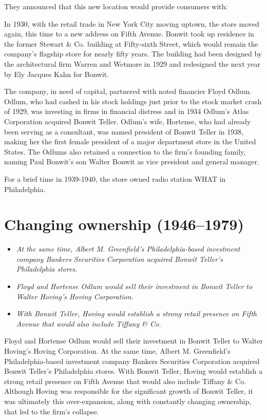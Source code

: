 They announced that this new location would provide consumers with:

In 1930, with the retail trade in New York City moving uptown, the store
moved again, this time to a new address on Fifth Avenue. Bonwit took up
residence in the former Stewart \& Co. building at Fifty-sixth Street,
which would remain the company's flagship store for nearly fifty years.
The building had been designed by the architectural firm Warren and
Wetmore in 1929 and redesigned the next year by Ely Jacques Kahn for
Bonwit.

The company, in need of capital, partnered with noted financier Floyd
Odlum. Odlum, who had cashed in his stock holdings just prior to the
stock market crash of 1929, was investing in firms in financial distress
and in 1934 Odlum's Atlas Corporation acquired Bonwit Teller. Odlum's
wife, Hortense, who had already been serving as a consultant, was named
president of Bonwit Teller in 1938, making her the first female
president of a major department store in the United States. The Odlums
also retained a connection to the firm's founding family, naming Paul
Bonwit's son Walter Bonwit as vice president and general manager.

For a brief time in 1939-1940, the store owned radio station WHAT in
Philadelphia.

\section{Changing ownership
(1946--1979)}\label{changing-ownership-19461979}

\begin{itemize}
\item
  \emph{At the same time, Albert M. Greenfield's Philadelphia-based
  investment company Bankers Securities Corporation acquired Bonwit
  Teller's Philadelphia stores.}
\item
  \emph{Floyd and Hortense Odlum would sell their investment in Bonwit
  Teller to Walter Hoving's Hoving Corporation.}
\item
  \emph{With Bonwit Teller, Hoving would establish a strong retail
  presence on Fifth Avenue that would also include Tiffany \& Co.}
\end{itemize}

Floyd and Hortense Odlum would sell their investment in Bonwit Teller to
Walter Hoving's Hoving Corporation. At the same time, Albert M.
Greenfield's Philadelphia-based investment company Bankers Securities
Corporation acquired Bonwit Teller's Philadelphia stores. With Bonwit
Teller, Hoving would establish a strong retail presence on Fifth Avenue
that would also include Tiffany \& Co. Although Hoving was responsible
for the significant growth of Bonwit Teller, it was ultimately this
over-expansion, along with constantly changing ownership, that led to
the firm's collapse.

